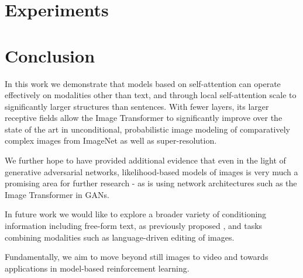 \documentclass{article} %
\begin{document}
\section{Experiments}


% 
% 
% 

\section{Conclusion}

In this work we demonstrate that models based on self-attention can operate effectively on modalities other than text, and through local self-attention scale to significantly larger structures than sentences. With fewer layers, its larger receptive fields allow the Image Transformer to significantly improve over the state of the art in unconditional, probabilistic image modeling of comparatively complex images from ImageNet as well as super-resolution.

We further hope to have provided additional evidence that even in the light of generative adversarial networks, likelihood-based models of images is very much a promising area for further research - as is using network architectures such as the Image Transformer in GANs.

In future work we would like to explore a broader variety of conditioning information including free-form text, as previously proposed \citep{Mansimov15}, and tasks combining modalities such as language-driven editing of images.

Fundamentally, we aim to move beyond still images to video \citep{Kalchbrenner16} and towards applications in model-based reinforcement learning.









% 
\end{document}

